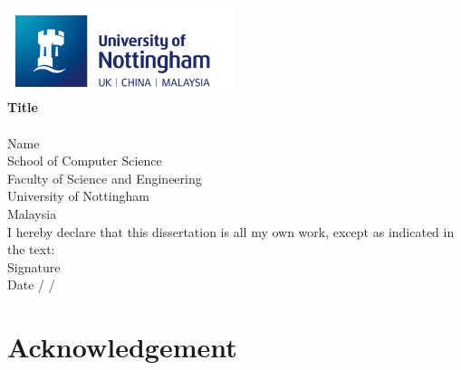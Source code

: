 \documentclass[a4paper,12pt]{article}
\begin{document}
\newpage
\begin{titlepage}
    \begin{center}
        \vspace{0.1em}
        \includegraphics[width=0.5\textwidth]{images/nottingham_logo.png}\\[6em]

        \textbf{\large Title}\\[6em]

        \\[4em]

        Name\\
        School of Computer Science\\
        Faculty of Science and Engineering\\
        University of Nottingham\\
        Malaysia\\[6em]

        I hereby declare that this dissertation is all my own work, except as indicated in the text:\\[4em]

        Signature \underline{\hspace{7cm}}\\[2em]
        Date \hspace{1cm} \underline{\hspace{1cm}} / \underline{\hspace{1cm}} / \underline{\hspace{2cm}}
    \end{center}
\end{titlepage}



\newpage
\section*{\centering \normalsize{Acknowledgement}}
\end{document}
